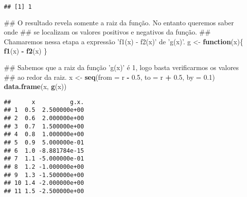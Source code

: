 \documentclass[]{book}
\newenvironment{Shaded}{\begin{snugshade}}{\end{snugshade}}
\newcommand{\KeywordTok}[1]{\textcolor[rgb]{0.13,0.29,0.53}{\textbf{#1}}}
\newcommand{\DataTypeTok}[1]{\textcolor[rgb]{0.13,0.29,0.53}{#1}}
\newcommand{\DecValTok}[1]{\textcolor[rgb]{0.00,0.00,0.81}{#1}}
\newcommand{\FloatTok}[1]{\textcolor[rgb]{0.00,0.00,0.81}{#1}}
\newcommand{\StringTok}[1]{\textcolor[rgb]{0.31,0.60,0.02}{#1}}
\newcommand{\ControlFlowTok}[1]{\textcolor[rgb]{0.13,0.29,0.53}{\textbf{#1}}}
\newcommand{\OperatorTok}[1]{\textcolor[rgb]{0.81,0.36,0.00}{\textbf{#1}}}
\newcommand{\NormalTok}[1]{#1}
\begin{document}
\begin{enumerate}
\begin{Shaded}
\end{Shaded}

\begin{verbatim}
## [1] 1
\end{verbatim}

\begin{Shaded}
\begin{Highlighting}[]
\NormalTok{##  O resultado revela somente a raiz da função. No entanto queremos saber onde}
\NormalTok{## se localizam os valores positivos e negativos da função.}
\NormalTok{##  Chamaremos nessa etapa a expressão 'f1(x) - f2(x)' de 'g(x)'.}
\NormalTok{g <-}\StringTok{ }\ControlFlowTok{function}\NormalTok{(x)\{}
  \KeywordTok{f1}\NormalTok{(x) }\OperatorTok{-}\StringTok{ }\KeywordTok{f2}\NormalTok{(x)}
\NormalTok{\}}

\NormalTok{##  Sabemos que a raiz da função 'g(x)' é 1, logo basta verificarmos os valores}
\NormalTok{## ao redor da raiz.}
\NormalTok{x <-}\StringTok{ }\KeywordTok{seq}\NormalTok{(}\DataTypeTok{from =}\NormalTok{ r }\OperatorTok{-}\StringTok{ }\FloatTok{0.5}\NormalTok{, }\DataTypeTok{to =}\NormalTok{ r }\OperatorTok{+}\StringTok{ }\FloatTok{0.5}\NormalTok{, }\DataTypeTok{by =} \FloatTok{0.1}\NormalTok{)}
\KeywordTok{data.frame}\NormalTok{(x, }\KeywordTok{g}\NormalTok{(x))}
\end{Highlighting}
\end{Shaded}

\begin{verbatim}
##      x          g.x.
## 1  0.5  2.500000e+00
## 2  0.6  2.000000e+00
## 3  0.7  1.500000e+00
## 4  0.8  1.000000e+00
## 5  0.9  5.000000e-01
## 6  1.0 -8.881784e-15
## 7  1.1 -5.000000e-01
## 8  1.2 -1.000000e+00
## 9  1.3 -1.500000e+00
## 10 1.4 -2.000000e+00
## 11 1.5 -2.500000e+00
\end{verbatim}


\end{enumerate}
\end{document}
